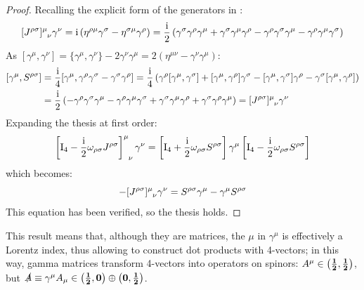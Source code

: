 \begin{proofbox}
  \begin{proof}
    Recalling the explicit form of the generators in :
    \begin{equation*}
      \tensor{[J^{\rho \sigma}]}{^\mu_\nu} \gamma^\nu = \img \left( \eta^{\rho \mu} \gamma^\sigma - \eta^{\sigma \mu} \gamma^\rho \right) = \frac{\img}{2} \left( \gamma^\sigma \gamma^\rho \gamma^\mu + \gamma^\sigma \gamma^\mu \gamma^\rho - \gamma^\rho \gamma^\sigma \gamma^\mu - \gamma^\rho \gamma^\mu \gamma^\sigma \right)
    \end{equation*}
    As $ [\gamma^\mu , \gamma^\nu] = \{\gamma^\mu , \gamma^\nu\} - 2 \gamma^\nu \gamma^\mu = 2 \left( \eta^{\mu \nu} - \gamma^\nu \gamma^\mu \right) $:
    \begin{equation*}
      \begin{split}
        [\gamma^\mu , S^{\rho \sigma}]
        &= \frac{\img}{4} [\gamma^\mu , \gamma^\rho \gamma^\sigma - \gamma^\sigma \gamma^\rho] = \frac{\img}{4} \left( \gamma^\rho [\gamma^\mu , \gamma^\sigma] + [\gamma^\mu , \gamma^\rho] \gamma^\sigma - [\gamma^\mu , \gamma^\sigma] \gamma^\rho - \gamma^\sigma [\gamma^\mu , \gamma^\rho] \right) \\
        &= \frac{\img}{2} \left( - \gamma^\rho \gamma^\sigma \gamma^\mu - \gamma^\rho \gamma^\mu \gamma^\sigma + \gamma^\sigma \gamma^\mu \gamma^\rho + \gamma^\sigma \gamma^\rho \gamma^\mu \right) = \tensor{[J^{\rho \sigma}]}{^\mu_\nu} \gamma^\nu
      \end{split}
    \end{equation*}
    Expanding the thesis at first order:
    \begin{equation*}
      \tensor{\left[ \mt{I}_4 - \frac{\img}{2} \omega_{\rho \sigma} J^{\rho \sigma} \right]}{^\mu_\nu} \gamma^\nu = \left[ \mt{I}_4 + \frac{\img}{2} \omega_{\rho \sigma} S^{\rho \sigma} \right] \gamma^\mu \left[ \mt{I}_4 - \frac{\img}{2} \omega_{\rho \sigma} S^{\rho \sigma} \right]
    \end{equation*}
    which becomes:
    \begin{equation*}
      - \tensor{[J^{\rho \sigma}]}{^\mu_\nu} \gamma^\nu = S^{\rho \sigma} \gamma^\mu - \gamma^\mu S^{\rho \sigma}
    \end{equation*}
    This equation has been verified, so the thesis holds.
  \end{proof}
\end{proofbox}

This result means that, although they are matrices, the $ \mu $ in $ \gamma^\mu $ is effectively a Lorentz index, thus allowing to construct dot products with 4-vectors; in this way, gamma matrices transform 4-vectors into operators on spinors\footnotemark: $ A^\mu \in \mathbf{\left( \frac{1}{2},\frac{1}{2} \right)} $, but $ \slashed{A} \equiv \gamma^\mu A_\mu \in \mathbf{\left( \frac{1}{2},0 \right)} \oplus \mathbf{\left( 0,\frac{1}{2} \right)} $.
%

